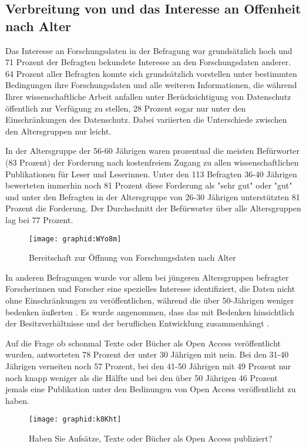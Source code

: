 \subsection{Verbreitung von und das Interesse an Offenheit nach Alter}

Das Interesse an Forschungsdaten in der Befragung war grundsätzlich hoch und 71 Prozent der Befragten bekundete Interesse an den Forschungsdaten anderer. 64 Prozent aller Befragten konnte sich grundsätzlich vorstellen unter bestimmten Bedingungen ihre Forschungsdaten und alle weiteren Informationen, die während Ihrer wissenschaftliche Arbeit anfallen unter Berücksichtigung von Datenschutz öffentlich zur Verfügung zu stellen, 28 Prozent sogar nur unter den Einschränkungen des Datenschutz. Dabei variierten die Unterschiede zwischen den Altersgruppen nur leicht.

In der Altersgruppe der 56-60 Jährigen waren prozentual die meisten Befürworter (83 Prozent) der Forderung nach kostenfreiem Zugang zu allen wissenschaftlichen Publikationen für Leser und Leserinnen. Unter den 113 Befragten 36-40 Jährigen bewerteten immerhin noch 81 Prozent diese Forderung als "sehr gut" oder "gut" und unter den Befragten in der Altersgruppe von 26-30 Jährigen unterstützten 81 Prozent die Forderung. Der Durchschnitt der Befürworter über alle Altersgruppen lag bei 77 Prozent.

\begin{figure}[h!]
\texttt{[image: graphid:WYo8m]}
\caption{Bereitschaft zur Öffnung von Forschungsdaten nach Alter}
\end{figure}

In anderen Befragungen wurde vor allem bei jüngeren Altersgruppen befragter Forscherinnen und Forscher eine spezielles Interesse identifiziert, die Daten nicht ohne Einschränkungen zu veröffentlichen, während die über 50-Jährigen weniger bedenken äußerten \cite{Tenopir_2011}. Es wurde angenommen, dass das mit Bedenken hinsichtlich der Besitzverhältnisse und der beruflichen Entwicklung zusammenhängt \cite{Tenopir_2011}.

Auf die Frage ob schonmal Texte oder Bücher als Open Access veröffentlicht wurden, antworteten 78 Prozent der unter 30 Jährigen mit nein. Bei den 31-40 Jährigen verneiten noch 57 Prozent, bei den 41-50 Jährigen mit 49 Prozent nur noch knapp weniger als die Hälfte und bei den über 50 Jährigen 46 Prozent jemals eine Publikation unter den Bedinungen von Open Access veröffentlicht zu haben.

\begin{figure}[h!]
\texttt{[image: graphid:k8Kht]}
\caption{Haben Sie Aufsätze, Texte oder Bücher als Open Access publiziert?}
\end{figure}

